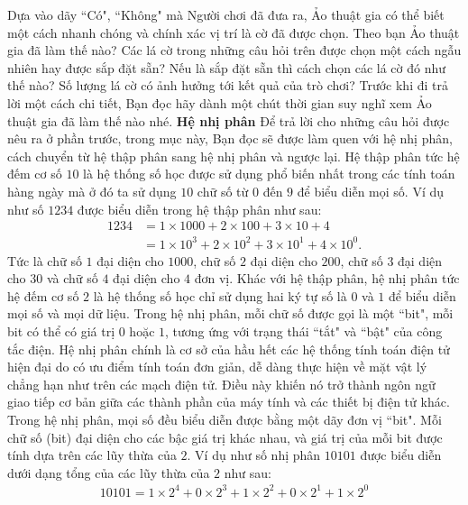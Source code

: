 \begin{multicols}{2}
\begin{figure}[H]
		\vspace*{-15pt}
	\end{figure}
	Dựa vào dãy ``Có", ``Không" mà Người chơi đã đưa ra, Ảo thuật gia có thể biết một cách nhanh chóng và chính xác vị trí là cờ đã được chọn. 
	\vskip 0.1cm
	Theo bạn Ảo thuật gia đã làm thế nào? Các lá cờ trong những câu hỏi trên được chọn một cách ngẫu nhiên hay được sắp đặt sẵn? Nếu là sắp đặt sẵn thì cách chọn các lá cờ đó như thế nào? Số lượng lá cờ có ảnh hưởng tới kết quả của trò chơi? Trước khi đi trả lời một cách chi tiết, Bạn đọc hãy dành một chút thời gian suy nghĩ xem Ảo thuật gia đã làm thế nào nhé. 
	\vskip 0.1cm
	\textbf{\color{hoccungpi}Hệ nhị phân}
	\vskip 0.1cm
	Để trả lời cho những câu hỏi được nêu ra ở phần trước, trong mục này, Bạn đọc sẽ được làm quen với hệ nhị phân, cách chuyển từ hệ thập phân sang hệ nhị phân và ngược lại.
	\vskip 0.1cm
	Hệ thập phân tức hệ đếm cơ số $10$ là hệ thống số học được sử dụng phổ biến nhất trong các tính toán hàng ngày mà ở đó ta sử dụng $10$ chữ số từ $0$ đến $9$ để biểu diễn mọi số. Ví dụ như số $1234$ được biểu diễn trong hệ thập phân như sau: 
	\begin{align*}
		1234&=1\!\times\!1000\!+\!2\!\times\!100\!+\!3\!\times\!10\!+\!4\\
		&=1\!\times\! 10^3 \!+\! 2\!\times\!10^2 \!+\! 3\!\times\!10^1 \!+\! 4\!\times\!10^0.
	\end{align*}
	Tức là chữ số $1$ đại diện cho $1000$, chữ số $2$ đại diện cho $200$, chữ số $3$ đại diện cho $30$ và chữ số $4$ đại diện cho $4$ đơn vị. 
	\vskip 0.1cm
	Khác với hệ thập phân, hệ nhị phân tức hệ đếm cơ số $2$ là hệ thống số học chỉ sử dụng hai ký tự số là $0$ và $1$ để biểu diễn mọi số và mọi dữ liệu. Trong hệ nhị phân, mỗi chữ số được gọi là một ``bit", mỗi bit có thể có giá trị $0$ hoặc $1$, tương ứng với trạng thái ``tắt" và ``bật" của công tắc điện. Hệ nhị phân chính là cơ sở của hầu hết các hệ thống tính toán điện tử hiện đại do có ưu điểm tính toán đơn giản, dễ dàng thực hiện về mặt vật lý chẳng hạn như trên các mạch điện tử. Điều này khiến nó trở thành ngôn ngữ giao tiếp cơ bản giữa các thành phần của máy tính và các thiết bị điện tử khác.
	\vskip 0.1cm 
	Trong hệ nhị phân, mọi số đều biểu diễn được bằng một dãy đơn vị ``bit". Mỗi chữ số (bit) đại diện cho các bậc giá trị khác nhau, và giá trị của mỗi bit được tính dựa trên các lũy thừa của $2$. Ví dụ như số nhị phân $10101$ được biểu diễn dưới dạng tổng của các lũy thừa của $2$ như sau:
	\begin{align*}
		10101\!=\!1\!\times\!\!2^4\!+\!0\!\times\!\!2^3\!+\!1\!\times\!2^2\!+\!0\!\times\!\!2^1\!+\!1\!\!\times\!\!2^0

\end{align*}
\end{multicols}
